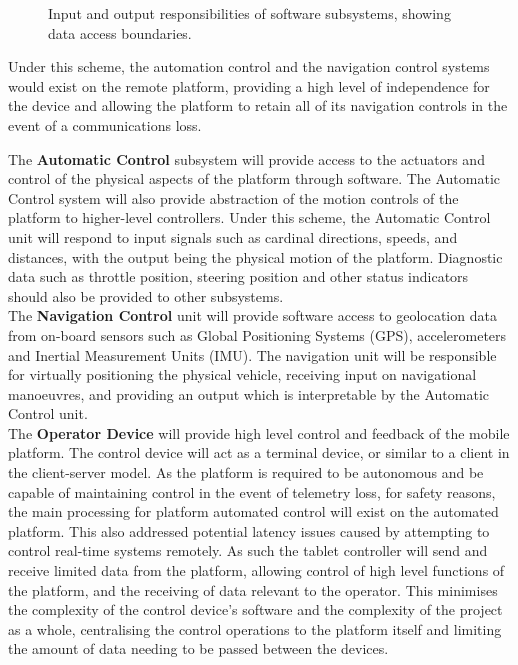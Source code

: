 \documentclass[main.tex]{subfiles}
\begin{document}
\begin{appendices}
\begin{figure}
\caption[Input and output responsibilities of software subsystems]{Input and output responsibilities of software subsystems, showing data access boundaries.} 
\end{figure}

Under this scheme, the automation control and the navigation control systems would exist on the remote platform, providing a high level of independence for the device and allowing the platform to retain all of its navigation controls in the event of a communications loss.

The \textbf{Automatic Control} subsystem will provide access to the actuators and control of the physical aspects of the platform through software. The Automatic Control system will also provide abstraction of the motion controls of the platform to higher-level controllers. Under this scheme, the Automatic Control unit will respond to input signals such as cardinal directions, speeds, and distances, with the output being the physical motion of the platform. Diagnostic data such as throttle position, steering position and other status indicators should also be provided to other subsystems. \\

The \textbf{Navigation Control} unit will provide software access to geolocation data from on-board sensors such as Global Positioning Systems (GPS), accelerometers and Inertial Measurement Units (IMU). The navigation unit will be responsible for virtually positioning the physical vehicle, receiving input on navigational manoeuvres, and providing an output which is interpretable by the Automatic Control unit.\\

The \textbf{Operator Device} will provide high level control and feedback of the mobile platform. 
The control device will act as a terminal device, or similar to a client in the client-server model. 
As the platform is required to be autonomous and be capable of maintaining control in the event of telemetry loss, for safety reasons, the main processing for platform automated control will exist on the automated platform. 
This also addressed potential latency issues caused by attempting to control real-time systems remotely.
As such the tablet controller will send and receive limited data from the platform, allowing control of high level functions of the platform, and the receiving of data relevant to the operator. 
This minimises the complexity of the control device’s software and the complexity of the project as a whole, centralising the control operations to the platform itself and limiting the amount of data needing to be passed between the devices.


\end{appendices}
\end{document}
